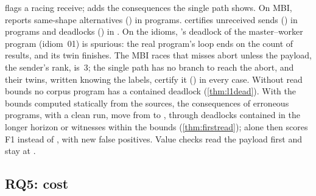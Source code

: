 \Lone flags a racing receive; \LoneSP adds the consequences the single path shows. On MBI,
\Lone reports \nMBIoneFfind same-shape alternatives () in \nMBIoneFprogs programs.
\LoneSP certifies \nMBIspCfind unreceived sends () in \nMBIspCprogs programs and
\nMBIspDfind deadlocks () in \nMBIspDprogs. On the idioms, \LoneSP's deadlock of the master--worker program
(idiom~01) is spurious: the real program's loop ends on the count of results, and its
\Ltwo twin finishes. The MBI races that \tool misses abort unless the payload, the sender's
rank, is~3; the single path has no branch to reach the abort, and their \Ltwo twins, written
knowing the labels, certify it () in every case. Without read bounds no corpus program has a contained deadlock
(\cref{thm:l1dead}). With the bounds computed statically from the sources, the
consequences of \nReadsMoved erroneous programs, \nReadsMovedClean with a clean run, move from
\LoneSP to \Lone, through deadlocks contained in the longer horizon or witnesses within
the bounds (\cref{thm:firstread}); \Lone alone then scores F1 \nReadsFoneLOne instead of
\nReadsFoneLOneBase, with \nReadsNewFP new false positives. Value checks read the payload
first and stay at \Ltwo.

\subsection{RQ5: cost}


